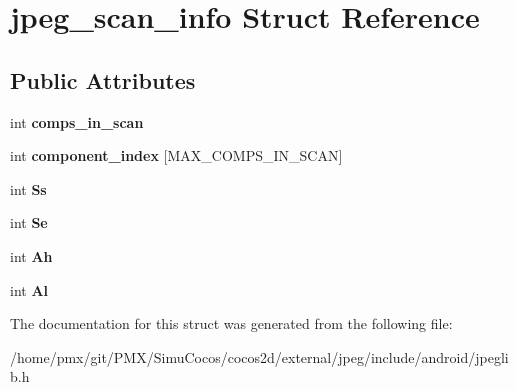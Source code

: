 \hypertarget{structjpeg__scan__info}{}\section{jpeg\+\_\+scan\+\_\+info Struct Reference}
\label{structjpeg__scan__info}
\subsection*{Public Attributes}
\begin{DoxyCompactItemize}
\item 
\mbox{\label{structjpeg__scan__info_addd94bff3ee52f961cf6fda5ea86ddca}} 
int {\bfseries comps\+\_\+in\+\_\+scan}
\item 
\mbox{\label{structjpeg__scan__info_adae9b3ceda4c7c14c9e18ae763db3570}} 
int {\bfseries component\+\_\+index} \mbox{[}M\+A\+X\+\_\+\+C\+O\+M\+P\+S\+\_\+\+I\+N\+\_\+\+S\+C\+AN\mbox{]}
\item 
\mbox{\label{structjpeg__scan__info_a33bc5abcded36ccd1b4c2ec94f6e2ba5}} 
int {\bfseries Ss}
\item 
\mbox{\label{structjpeg__scan__info_a4eefb8be0412f78566862c28a20fb254}} 
int {\bfseries Se}
\item 
\mbox{\label{structjpeg__scan__info_a43834ca9482c7ea12cc97cf602da004b}} 
int {\bfseries Ah}
\item 
\mbox{\label{structjpeg__scan__info_a89cc9e990977c50b2b2058e6b9526e67}} 
int {\bfseries Al}
\end{DoxyCompactItemize}


The documentation for this struct was generated from the following file\+:\begin{DoxyCompactItemize}
\item 
/home/pmx/git/\+P\+M\+X/\+Simu\+Cocos/cocos2d/external/jpeg/include/android/jpeglib.\+h\end{DoxyCompactItemize}
